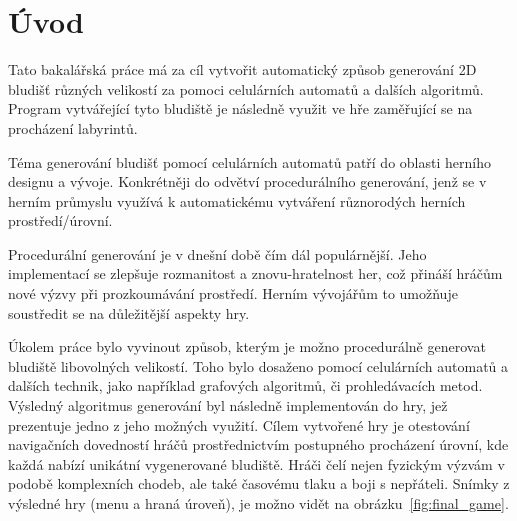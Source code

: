 
%

\chapter{Úvod}
Tato bakalářská práce má za cíl vytvořit automatický způsob generování 2D bludišť různých velikostí za pomoci celulárních automatů a dalších algoritmů. Program vytvářející tyto bludiště je následně využit ve hře zaměřující se na procházení labyrintů.

Téma generování bludišť pomocí celulárních automatů patří do oblasti herního designu a vývoje. Konkrétněji do odvětví procedurálního generování, jenž se v herním průmyslu využívá k automatickému vytváření různorodých herních prostředí/úrovní. 

Procedurální generování je v dnešní době čím dál populárnější. Jeho implementací se zlepšuje rozmanitost a znovu-hratelnost her, což přináší hráčům nové výzvy při prozkoumávání prostředí. Herním vývojářům to umožňuje soustředit se na důležitější aspekty hry.

Úkolem práce bylo vyvinout způsob, kterým je možno procedurálně generovat bludiště libovolných velikostí. Toho bylo dosaženo pomocí celulárních automatů a dalších technik, jako například grafových algoritmů, či prohledávacích metod. Výsledný algoritmus generování byl následně implementován do hry, jež prezentuje jedno z jeho možných využití. Cílem vytvořené hry je otestování navigačních dovedností hráčů prostřednictvím postupného procházení úrovní, kde každá nabízí unikátní vygenerované bludiště. Hráči čelí nejen fyzickým výzvám v podobě komplexních chodeb, ale také časovému tlaku a boji s nepřáteli. Snímky z výsledné hry (menu a hraná úroveň), je možno vidět na obrázku~\ref{fig:final_game}.

